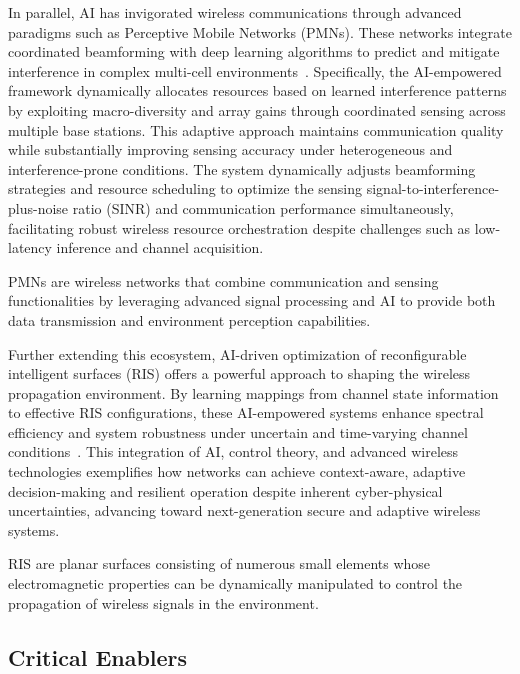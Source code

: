 \documentclass[sigconf]{acmart}
\begin{document}
In parallel, AI has invigorated wireless communications through advanced paradigms such as Perceptive Mobile Networks (PMNs). These networks integrate coordinated beamforming with deep learning algorithms to predict and mitigate interference in complex multi-cell environments~\cite{ref47}. Specifically, the AI-empowered framework dynamically allocates resources based on learned interference patterns by exploiting macro-diversity and array gains through coordinated sensing across multiple base stations. This adaptive approach maintains communication quality while substantially improving sensing accuracy under heterogeneous and interference-prone conditions. The system dynamically adjusts beamforming strategies and resource scheduling to optimize the sensing signal-to-interference-plus-noise ratio (SINR) and communication performance simultaneously, facilitating robust wireless resource orchestration despite challenges such as low-latency inference and channel acquisition.

\begin{definition}
PMNs are wireless networks that combine communication and sensing functionalities by leveraging advanced signal processing and AI to provide both data transmission and environment perception capabilities.
\end{definition}

Further extending this ecosystem, AI-driven optimization of reconfigurable intelligent surfaces (RIS) offers a powerful approach to shaping the wireless propagation environment. By learning mappings from channel state information to effective RIS configurations, these AI-empowered systems enhance spectral efficiency and system robustness under uncertain and time-varying channel conditions~\cite{ref48}. This integration of AI, control theory, and advanced wireless technologies exemplifies how networks can achieve context-aware, adaptive decision-making and resilient operation despite inherent cyber-physical uncertainties, advancing toward next-generation secure and adaptive wireless systems.

\begin{definition}
RIS are planar surfaces consisting of numerous small elements whose electromagnetic properties can be dynamically manipulated to control the propagation of wireless signals in the environment.
\end{definition}

\subsection{Critical Enablers}
\end{document}
